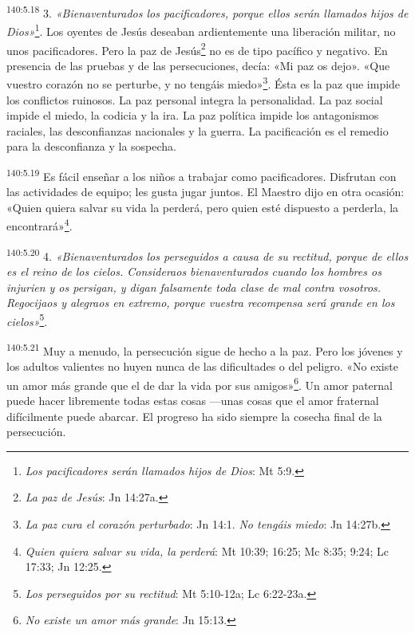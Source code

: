 \par 
\textsuperscript{140:5.18} 3. \textit{«Bienaventurados los pacificadores, porque ellos serán llamados hijos de Dios»}\footnote{\textit{Los pacificadores serán llamados hijos de Dios}: Mt 5:9.}. Los oyentes de Jesús deseaban ardientemente una liberación militar, no unos pacificadores. Pero la paz de Jesús\footnote{\textit{La paz de Jesús}: Jn 14:27a.} no es de tipo pacífico y negativo. En presencia de las pruebas y de las persecuciones, decía: «Mi paz os dejo». «Que vuestro corazón no se perturbe, y no tengáis miedo»\footnote{\textit{La paz cura el corazón perturbado}: Jn 14:1. \textit{No tengáis miedo}: Jn 14:27b.}. Ésta es la paz que impide los conflictos ruinosos. La paz personal integra la personalidad. La paz social impide el miedo, la codicia y la ira. La paz política impide los antagonismos raciales, las desconfianzas nacionales y la guerra. La pacificación es el remedio para la desconfianza y la sospecha.

\par 
\textsuperscript{140:5.19} Es fácil enseñar a los niños a trabajar como pacificadores. Disfrutan con las actividades de equipo; les gusta jugar juntos. El Maestro dijo en otra ocasión: «Quien quiera salvar su vida la perderá, pero quien esté dispuesto a perderla, la encontrará»\footnote{\textit{Quien quiera salvar su vida, la perderá}: Mt 10:39; 16:25; Mc 8:35; 9:24; Lc 17:33; Jn 12:25.}.

\par 
\textsuperscript{140:5.20} 4. \textit{«Bienaventurados los perseguidos a causa de su rectitud, porque de ellos es el reino de los cielos. Consideraos bienaventurados cuando los hombres os injurien y os persigan, y digan falsamente toda clase de mal contra vosotros. Regocijaos y alegraos en extremo, porque vuestra recompensa será grande en los cielos»}\footnote{\textit{Los perseguidos por su rectitud}: Mt 5:10-12a; Lc 6:22-23a.}.

\par 
\textsuperscript{140:5.21} Muy a menudo, la persecución sigue de hecho a la paz. Pero los jóvenes y los adultos valientes no huyen nunca de las dificultades o del peligro. «No existe un amor más grande que el de dar la vida por sus amigos»\footnote{\textit{No existe un amor más grande}: Jn 15:13.}. Un amor paternal puede hacer libremente todas estas cosas ---unas cosas que el amor fraternal difícilmente puede abarcar. El progreso ha sido siempre la cosecha final de la persecución.

